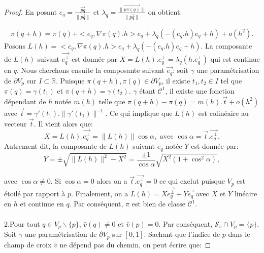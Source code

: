 \begin{proof}
En posant $e_q=\displaystyle\frac{\overrightarrow{pq}}{\|\overrightarrow{pq}\|}$ et $\lambda_q=\displaystyle\frac{\|\overrightarrow{p\pi(q)}\|}{\|\overrightarrow{pq}\|}$ on obtient:

\begin{eqnarray*}
    \pi(q+h) = \pi(q)+<e_q,\nabla\pi(q).h>e_q+\lambda_q(-(e_q.h)e_q+h)+o(h^2).
\end{eqnarray*}
Posons $L(h)=<e_q,\nabla\pi(q).h>e_q+\lambda_q(-(e_q.h)e_q+h)$. La composante de $L(h)$ suivant $\overrightarrow{e_q^\perp}$ est donnée par $X=L(h).e_q^\perp=\lambda_q(h.e_q^\perp)$ qui est continue en $q$. Nous cherchons ensuite la composante suivant $\overrightarrow{e_q}$: soit $\gamma$ une paramétrisation de $\partial V_p$ sur $I\subset\mathbb{R}$. Puisque $\pi(q+h),\pi(q)\in\partial V_p$, il existe $t_1, t_2\in I$ tel que $\pi(q)=\gamma(t_1)$ et $\pi(q+h)=\gamma(t_2)$. $\gamma$ étant $\mathcal{C}^1$, il existe une fonction dépendant de $h$ notée $m(h)$ telle que $\pi(q+h)-\pi(q)=m(h).\overrightarrow{t}+o(h^2)$ avec $\overrightarrow{t}=\gamma'(t_1).\|\gamma'(t_1)\|^{-1}$. Ce qui implique que $L(h)$ est colinéaire au vecteur $\overrightarrow{t}$. Il vient alors que:
$$
X=L(h).\overrightarrow{e_q^\perp}=\|L(h)\|\cos{\alpha},\mbox{ avec }\cos{\alpha}=\overrightarrow{t}.\overrightarrow{e_q^\perp}.
$$
Autrement dit, la composante de $L(h)$ suivant $e_q$ notée $Y$ est donnée par:
$$
Y=\pm\sqrt{\|L(h)\|^2-X^2}=\frac{\pm 1}{\cos{\alpha}}\sqrt{X^2(1+\cos^2\alpha)},
$$

avec $\cos{\alpha}\neq 0$. Si $\cos{\alpha}= 0$ alors on a $\overrightarrow{t}.\overrightarrow{e_q^\perp}=0$ ce qui exclut puisque $V_p$ est étoilé par rapport à $p$. Finalement, on a $L(h)=X\overrightarrow{e_q^\perp}+ Y\overrightarrow{e_q}$ avec $X$ et $Y$ linéaire en $h$ et continue en $q$. Par conséquent, $\pi$ est bien de classe $\mathcal{C}^1$.\\\\
2.\quad Pour tout $q\in V_p\backslash\{p\}$, $\bar{v}(q)\neq 0$ et $\bar{v}(p)=0$. Par conséquent, $\mathcal{S}_{\bar{v}}\cap V_p=\{p\}$. Soit $\gamma$ une paramétrisation de $\partial V_p$ sur $[0, 1]$. Sachant que l'indice de $p$ dans le champ de croix $\bar{v}$ ne dépend pas du chemin, on peut écrire que:

\end{proof}

